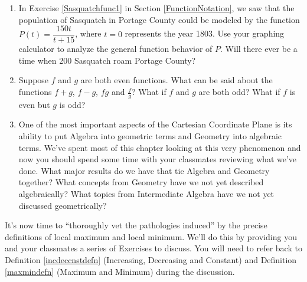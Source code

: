 \begin{enumerate}
\setcounter{enumi}{\value{HW}}

\item In Exercise \ref{Sasquatchfunc1} in Section \ref{FunctionNotation}, we saw that the population of Sasquatch in Portage County could be modeled by the function $P(t) = \dfrac{150t}{t + 15}$, where $t = 0$ represents the year 1803. Use your graphing calculator to analyze the general function behavior of $P$.  Will there ever be a time when 200 Sasquatch roam Portage County?

\item  Suppose $f$ and $g$ are both even functions.  What can be said about the functions $f+g$, $f-g$, $fg$ and $\frac{f}{g}$?  What if $f$ and $g$ are both odd?  What if $f$ is even but $g$ is odd?  

\item One of the most important aspects of the Cartesian Coordinate Plane is its ability to put Algebra into geometric terms and Geometry into algebraic terms.  We've spent most of this chapter looking at this very phenomenon and now you should spend some time with your classmates reviewing what we've done.  What major results do we have that tie Algebra and Geometry together?  What concepts from Geometry have we not yet described algebraically?  What topics from Intermediate Algebra have we not yet discussed geometrically?

\setcounter{HW}{\value{enumi}}
\end{enumerate}

It's now time to ``thoroughly vet the pathologies induced'' by the precise definitions of local maximum and local minimum.  We'll do this by providing you and your classmates a series of Exercises to discuss. You will need to refer back to Definition \ref{incdeccnstdefn} (Increasing, Decreasing and Constant) and Definition \ref{maxmindefn} (Maximum and Minimum) during the discussion.

